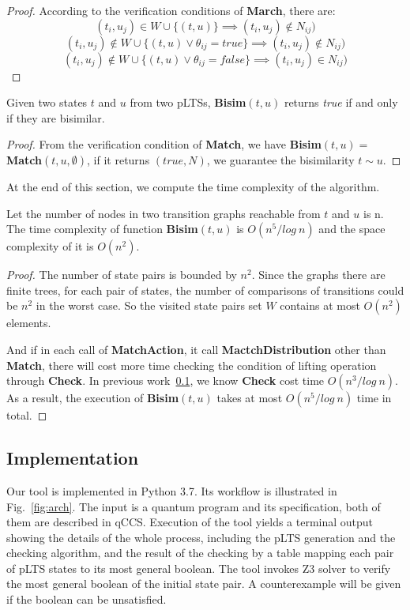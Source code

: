 \documentclass[runningheads]{llncs}
\begin{document}
\begin{proof}
According to the verification conditions of \textbf{March}, there are:
\[(t_i,u_j)\in W\cup\{(t,u)\}\implies(t_i,u_j)\notin N_{ij})\]
\[(t_i,u_j)\notin W\cup\{(t,u)\vee\theta_{ij}=true\}\implies(t_i,u_j)\notin N_{ij})\]
\[(t_i,u_j)\notin W\cup\{(t,u)\vee\theta_{ij}=false\}\implies(t_i,u_j)\in N_{ij})\]
\end{proof}
\begin{theorem}[Correctness]

Given two states $t$ and $u$ from two pLTSs, \textbf{Bisim}$(t,u)$ returns \textit{true} if and only if they are bisimilar.
\end{theorem} 
\begin{proof}
From the verification condition of \textbf{Match}, we have
\textbf{Bisim}$(t,u)=$\\\textbf{Match}$(t,u,\emptyset)$, if it
returns $(true, N)$, we guarantee the bisimilarity $t\sim u$.
\end{proof}
At the end of this section, we compute the time complexity of the algorithm.
\begin{theorem}[Complexity]
Let the number of nodes in two transition graphs reachable from $t$ and $u$ is n. The time complexity of function \textbf{Bisim}$(t,u)$ is $O(n^5/log\ n)$ and the space complexity of it is $O(n^2)$.
\end{theorem}
\begin{proof}
 The number of state pairs is bounded by $n^2$. Since the graphs there are finite trees, for each pair of states, the number of comparisons of transitions could be $n^2$ in the worst case. So the visited state pairs set $W$ contains at most $O(n^2)$ elements.

And if in each call of \textbf{MatchAction}, it call \textbf{MactchDistribution} other than \textbf{Match}, there will cost more time checking the condition of lifting operation through \textbf{Check}. In previous work~\ref{}, we know \textbf{Check} cost time $O(n^3/log\ n)$. As a result, the execution of \textbf{Bisim}$(t,u)$ takes at most $O(n^5/log\ n)$ time in total.
\end{proof}
\subsection{Implementation}
Our tool is implemented in Python 3.7. Its workflow is illustrated in Fig.~\ref{fig:arch}. The input is a quantum program and its specification, both of them are described in qCCS. Execution of the tool yields a terminal output showing the details of the whole process, including the pLTS generation and the checking algorithm, and the result of the checking by a table mapping each pair of pLTS states to its most general boolean. The tool invokes Z3 solver to verify the most general boolean of the initial state pair. A counterexample will be given if the boolean can be unsatisfied.
\end{document}
